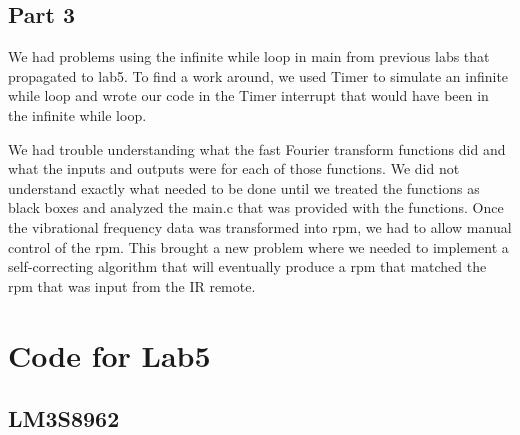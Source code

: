\documentclass[11pt, titlepage]{article}
\begin{document}
        \subsection{Part 3}
            We had problems using the infinite while loop in main from previous labs that propagated to lab5. To find a work around, we used Timer to simulate an infinite while loop and wrote our code in the Timer interrupt that would have been in the infinite while loop.
            
            \vspace{0.5cm}
            We had trouble understanding what the fast Fourier transform functions did and what the inputs and outputs were for each of those functions. We did not understand exactly what needed to be done until we treated the functions as black boxes and analyzed the main.c that was provided with the functions. Once the vibrational frequency data was transformed into rpm, we had to allow manual control of the rpm. This brought a new problem where we needed to implement a self-correcting algorithm that will eventually produce a rpm that matched the rpm that was input from the IR remote.
    \appendix
    \section{Code for Lab5}
        \subsection{LM3S8962}
            
\end{document}
